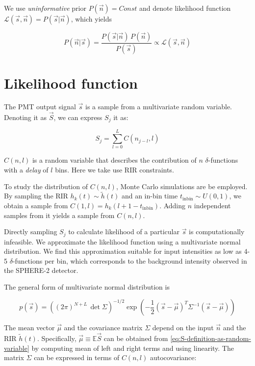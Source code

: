 We use \textit{uninformative} prior $P(\vec{n}) = Const$ and denote likelihood function $\mathcal{L}(\vec{s}, \vec{n}) = P(\vec{s} | \vec{n})$, which yields

\begin{equation}
	\label{eq:bayes-theorem-adapted}
	P(\vec{n} | \vec{s}) = \frac{P(\vec{s} | \vec{n}) \, P(\vec{n})}{P(\vec{s})} \propto \mathcal{L}(\vec{s}, \vec{n})
\end{equation}

\section{Likelihood function}
\label{sec:naive-monte-carlo-likelihood}

The PMT output signal $\vec{s}$ is a sample from a multivariate random variable. Denoting it as $\vec{S}$, we can express $S_j$ it as:

\begin{equation}
	S_j = \sum_{l=0}^{L} C(n_{j-l}, l)
	\label{eq:S-definition-as-random-variable}
\end{equation}

$C(n, l)$ is a random variable that describes the contribution of $n$ $\delta$-functions with a \textit{delay} of $l$ bins. Here we take use RIR constraints.

To study the distribution of $C(n, l)$, Monte Carlo simulations are be employed. By sampling the RIR $h_k(t) \sim \tilde{h}(t)$ and an in-bin time $t_{\text{inbin}} \sim U(0, 1)$, we obtain a sample from $C(1, l) = h_k(l + 1 - t_{\text{inbin}})$. Adding $n$ independent samples from it yields a sample from $C(n, l)$.

Directly sampling $S_j$ to calculate likelihood of a particular $\vec{s}$ is computationally infeasible. We approximate the likelihood function using a multivariate normal distribution. We find this approximation suitable for input intensities as low as 4-5 $\delta$-functions per bin, which corresponds to the background intensity observed in the SPHERE-2 detector.

The general form of multivariate normal distribution is

\begin{equation}
	\label{eq:multivariate-normal-density}
	p(\vec{s}) = \left( (2 \pi)^{N+L} \, \det \Sigma \right)^{-1/2} \exp \left( - \frac{1}{2} (\vec{s} - \vec{\mu})^T \Sigma^{-1} (\vec{s} - \vec{\mu}) \right)
\end{equation}

The mean vector $\vec{\mu}$ and the covariance matrix $\Sigma$ depend on the input $\vec{n}$ and the RIR $\tilde{h}(t)$. Specifically, $\vec{\mu} \equiv \mathbb{E} \vec{S}$ can be obtained from \ref{eq:S-definition-as-random-variable} by computing mean of left and right terms and using linearity. The matrix $\Sigma$ can be expressed in terms of $C(n, l)$ autocovariance:

